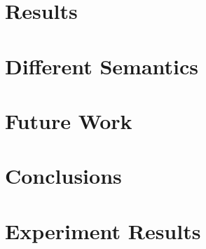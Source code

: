 \documentclass[11pt,a4paper]{article}
\begin{document}
\clearpage
\section{Results}


\clearpage
\section{Different Semantics}


\clearpage
\section{Future Work}


\clearpage
\section{Conclusions}


\clearpage
{}


\clearpage
\appendix
\section{Experiment Results}
\label{app:results}

\end{document}
